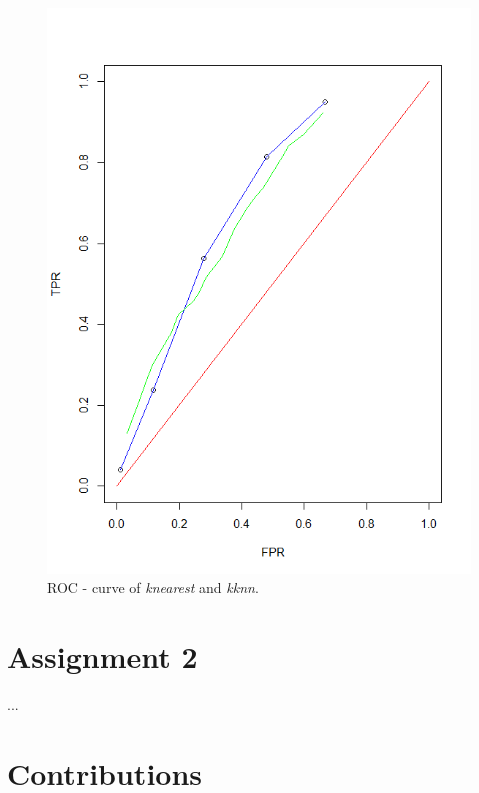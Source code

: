 \documentclass[a4paper, twocolumn]{article}
\begin{document}
\begin{figure}[H]
\centering
\begin{minipage}[]{0.5\textwidth}
  \includegraphics[width=\textwidth]{share/Lab1_A1_ROC.png}  
  \caption{ROC - curve of  \textit{knearest} and  \textit{kknn}.\label{fig:roc} }
 \end{minipage}
\end{figure}

    \section*{Assignment 2}

    ...

    \section*{Contributions}
\end{document}
